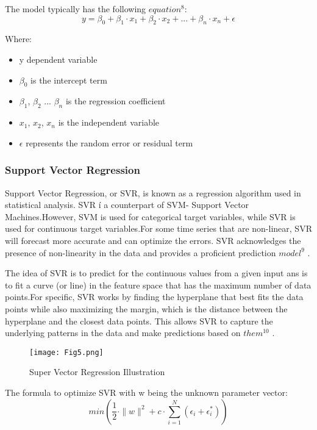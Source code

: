 \documentclass{ieeeojies}
\begin{document}
The model typically has the following $equation^{8}$:
\begin{equation*}
    y = \beta_{0} + \beta_{1}\cdot x_{1} + \beta_{2}\cdot x_{2} + ... + \beta_{n}\cdot x_{n} + \epsilon
\end{equation*}

Where:
\begin{itemize}
    \item 	y  dependent variable
    \item $\beta_{0}$ is the intercept term
    \item $\beta_{1}$, $\beta_{2}$ $...$ $\beta_{n}$ is the regression coefficient
    \item $x_1$, $x_2$, $x_n$ is the independent variable
    \item $\epsilon$ represents the random error or residual term
\end{itemize}

\subsubsection{\textbf{Support Vector Regression}}
Support Vector Regression, or SVR, is known as a regression algorithm used in statistical analysis. SVR í a counterpart of SVM- Support Vector Machines.However, SVM is used for categorical target variables, while SVR is used for continuous target variables.For some time series that are non-linear, SVR will forecast more accurate and can optimize the errors. SVR acknowledges the presence of non-linearity in the data and provides a proficient prediction $model^9$ . 

The idea of SVR is to predict for the continuous values from a given input ans is to fit a curve (or line) in the feature space that has the maximum number of data points.For specific, SVR works by finding the hyperplane that best fits the data points while also maximizing the margin, which is the distance between the hyperplane and the closest data points. This allows SVR to capture the underlying patterns in the data and make predictions based on $them^{10}$ .

\begin{figure}[ht]
  \centering
  \texttt{[image: Fig5.png]}
  \caption{Super Vector Regression Illustration}
  \label{fig:example}
\end{figure}

The formula to optimize SVR with w being the
unknown parameter vector:
\begin{equation*}
    min(\frac{1}{2} \cdot \|w\|^2 + c \cdot \sum_{i=1}^N(\epsilon_i + \epsilon_i^{*})) 
\end{equation*}
\end{document}

